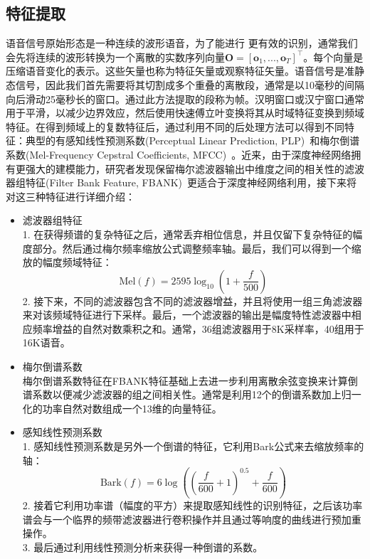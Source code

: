 \subsection{特征提取}
\label{sec:feat_extra}
语音信号原始形态是一种连续的波形语音，为了能进行 更有效的识别，通常我们会先将连续的波形转换为一个离散的实数序列向量$\mathbf{O}=\left[ \mathbf{o}_1, ..., \mathbf{o}_T \right]^\top$。每个向量是压缩语音变化的表示。这些矢量也称为特征矢量或观察特征矢量。语音信号是准静态信号，因此我们首先需要将其切割成多个重叠的离散段，通常是以10毫秒的间隔向后滑动25毫秒长的窗口。通过此方法提取的段称为帧。汉明窗口或汉宁窗口通常用于平滑，以减少边界效应，然后使用快速傅立叶变换将其从时域特征变换到频域特征。在得到频域上的复数特征后，通过利用不同的后处理方法可以得到不同特征：典型的有感知线性预测系数(Perceptual Linear Prediction, PLP)~\cite{hermansky1990perceptual}和梅尔倒谱系数(Mel-Frequency Cepstral Coefficients, MFCC)~\cite{davis1980comparison}。近来，由于深度神经网络拥有更强大的建模能力，研究者发现保留梅尔滤波器输出中维度之间的相关性的滤波器组特征(Filter Bank Feature, FBANK)~\cite{seide2011feature}更适合于深度神经网络利用，接下来将对这三种特征进行详细介绍：
\begin{itemize}
    \item 滤波器组特征 \\
    1. 在获得频谱的复杂特征之后，通常丢弃相位信息，并且仅留下复杂特征的幅度部分。然后通过梅尔频率缩放公式调整频率轴。最后，我们可以得到一个缩放的幅度频域特征：
    \begin{equation}
        \text{Mel}(f)=2595 \log_{10}(1+\frac{f}{500}) 
    \end{equation}
    2. 接下来，不同的滤波器包含不同的滤波器增益，并且将使用一组三角滤波器来对该频域特征进行下采样。最后，一个滤波器的输出是幅度特性滤波器中相应频率增益的自然对数乘积之和。通常，36组滤波器用于8K采样率，40组用于16K语音。
    \item 梅尔倒谱系数 \\
    梅尔倒谱系数特征在FBANK特征基础上去进一步利用离散余弦变换来计算倒谱系数以便减少滤波器的组之间相关性。通常是利用12个的倒谱系数加上归一化的功率自然对数组成一个13维的向量特征。
    \item 感知线性预测系数 \\
    1. 感知线性预测系数是另外一个倒谱的特征，它利用Bark公式来去缩放频率的轴：
    \begin{equation}
        \text{Bark}(f)=6\log \left( \left( \frac{f}{600}+1 \right)^{0.5}+\frac{f}{600} \right)
    \end{equation}
    2. 接着它利用功率谱（幅度的平方）来提取感知线性的识别特征，之后该功率谱会与一个临界的频带滤波器进行卷积操作并且通过等响度的曲线进行预加重操作。\\
    3. 最后通过利用线性预测分析来获得一种倒谱的系数。
\end{itemize}
